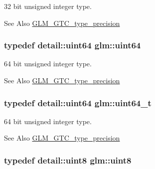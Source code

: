 32 bit unsigned integer type. 

\begin{DoxySeeAlso}{See Also}
\hyperlink{group__gtc__type__precision}{G\-L\-M\-\_\-\-G\-T\-C\-\_\-type\-\_\-precision} 
\end{DoxySeeAlso}
\hypertarget{group__gtc__type__precision_gae3632bf9b37da66233d78930dd06378a}{
\subsubsection[{uint64}]{\setlength{\rightskip}{0pt plus 5cm}typedef detail\-::uint64 {\bf glm\-::uint64}}}\label{group__gtc__type__precision_gae3632bf9b37da66233d78930dd06378a}


64 bit unsigned integer type. 

\begin{DoxySeeAlso}{See Also}
\hyperlink{group__gtc__type__precision}{G\-L\-M\-\_\-\-G\-T\-C\-\_\-type\-\_\-precision} 
\end{DoxySeeAlso}
\hypertarget{group__gtc__type__precision_ga058f57c19e1befdcf12498944bd73e69}{
\subsubsection[{uint64\-\_\-t}]{\setlength{\rightskip}{0pt plus 5cm}typedef detail\-::uint64 {\bf glm\-::uint64\-\_\-t}}}\label{group__gtc__type__precision_ga058f57c19e1befdcf12498944bd73e69}


64 bit unsigned integer type. 

\begin{DoxySeeAlso}{See Also}
\hyperlink{group__gtc__type__precision}{G\-L\-M\-\_\-\-G\-T\-C\-\_\-type\-\_\-precision} 
\end{DoxySeeAlso}
\hypertarget{group__gtc__type__precision_ga1a7dcd8aac97cc8020817c94049deff2}{
\subsubsection[{uint8}]{\setlength{\rightskip}{0pt plus 5cm}typedef detail\-::uint8 {\bf glm\-::uint8}}}\label{group__gtc__type__precision_ga1a7dcd8aac97cc8020817c94049deff2}


